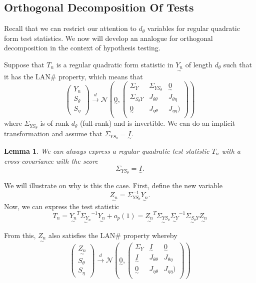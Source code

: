 \documentclass[twoside]{article}
\newtheorem{lemma}[theorem]{Lemma}
\newcommand{\utilde}{\underset{\sim}}
\begin{document}
\subsection{Orthogonal Decomposition Of Tests}
Recall that we can restrict our attention to $d_{\theta}$ variables for regular quadratic form test statistics. We now will develop an analogue for orthogonal decomposition in the context of hypothesis testing.

Suppose that $T_n$ is a regular quadratic form statistic in $\utilde{Y_n}$ of length $d_{\theta}$ such that it has the LAN\# property, which means that
$$
\begin{pmatrix}
Y_n\\
S_{\theta}\\
S_{\eta}
\end{pmatrix}
\xrightarrow{d}
\mathcal{N}(\utilde{0}, \begin{pmatrix} \Sigma_Y & \Sigma_{Y S_{\theta}} & \utilde{0}\\ \Sigma_{S_{\theta}Y} & J_{\theta \theta} & J_{\theta \eta}\\ \utilde{0} & J_{\eta \theta} & J_{\eta \eta})\\
\end{pmatrix})
$$
where $\Sigma_{Y S_{\theta}}$ is of rank $d_{\theta}$ (full-rank) and is invertible. We can do an implicit transformation and assume that $\Sigma_{Y S_{\theta}} = \utilde{I}.$

\begin{lemma}We can always express a regular quadratic test statistic $T_n$ with a cross-covariance with the score 
$$
\Sigma_{Y S_{\theta}} = \utilde{I}.
$$
\end{lemma}

We will illustrate on why is this the case. First, define the new variable
$$
\utilde{Z_n} = \Sigma_{Y S_{\theta}}^{-1}\utilde{Y_n}.
$$
Now, we can express the test statistic 
$$
T_n = \utilde{Y_n}^T\utilde{\Sigma_{Y_{n}}}^{-1}\utilde{Y_n} + o_p(1) = \utilde{Z_n}^T\utilde{\Sigma_{YS_{\theta}}}\utilde{\Sigma_{Y}}^{-1}\utilde{\Sigma_{S_{\theta}Y}}\utilde{Z_n}
$$

From this, $\utilde{Z_n}$ also satisfies the LAN\# property whereby
$$
\begin{pmatrix}
\utilde{Z_n}\\
S_{\theta}\\
S_{\eta}
\end{pmatrix}
\xrightarrow{d}
\mathcal{N}(\utilde{0}, \begin{pmatrix} \Sigma_Y & \utilde{I} & \utilde{0}\\ \utilde{I} & J_{\theta \theta} & J_{\theta \eta}\\ \utilde{0} & J_{\eta \theta} & J_{\eta \eta})\\
\end{pmatrix})
$$
\end{document}
